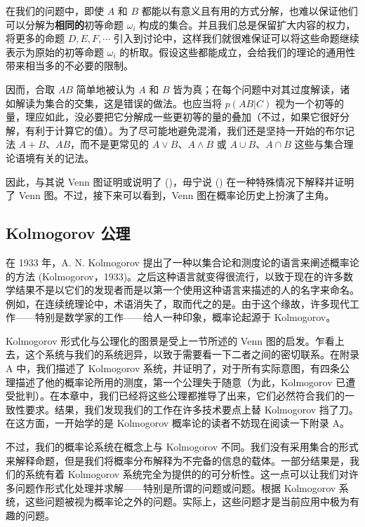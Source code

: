 在我们的问题中，即使 $A$ 和 $B$ 都能以有意义且有用的方式分解，也难以保证他们可以分解为{\bf 相同的}初等命题 $\omega_i$ 构成的集合。并且我们总是保留扩大内容的权力，将更多的命题 $D, E, F,\cdots$ 引入到讨论中，这样我们就很难保证可以将这些命题继续表示为原始的初等命题 $\omega_i$ 的析取。假设这些都能成立，会给我们的理论的通用性带来相当多的不必要的限制。

因而，合取 $AB$ 简单地被认为 $A$ 和 $B$ 皆为真；在每个问题中对其过度解读，诸如解读为集合的交集，这是错误的做法。也应当将 $p(AB|C)$ 视为一个初等的量，理应如此，没必要把它分解成一些更初等的量的叠加（不过，如果它很好分解，有利于计算它的值）。为了尽可能地避免混淆，我们还是坚持一开始的布尔记法 $A + B$、$AB$，而不是更常见的 $A\vee B$、$A\wedge B$ 或 $A\cup B$、$A\cap B$ 这些与集合理论语境有关的记法。

因此，与其说 Venn 图证明或说明了 (\in[2-104])，毋宁说 (\in[2-104]) 在一种特殊情况下解释并证明了 Venn 图。不过，接下来可以看到，Venn 图在概率论历史上扮演了主角。

\subsection{Kolmogorov 公理}

在 1933 年，A. N. Kolmogorov 提出了一种以集合论和测度论的语言来阐述概率论的方法 (Kolmogorov，1933)。之后这种语言就变得很流行，以致于现在的许多数学结果不是以它们的发现者而是以第一个使用这种语言来描述的人的名字来命名。例如，在连续统理论中，术语消失了，取而代之的是。由于这个缘故，许多现代工作——特别是数学家的工作——给人一种印象，概率论起源于 Kolmogorov。

Kolmogorov 形式化与公理化的图景是受上一节所述的 Venn 图的启发。乍看上去，这个系统与我们的系统迥异，以致于需要看一下二者之间的密切联系。在附录 A 中，我们描述了 Kolmogorov 系统，并证明了，对于所有实际意图，有四条公理描述了他的概率论所用的测度，第一个公理失于随意（为此，Kolmogorov 已遭受批判）。在本章中，我们已经将这些公理都推导了出来，它们必然符合我们的一致性要求。结果，我们发现我们的工作在许多技术要点上替 Kolmogorov 挡了刀。在这方面，一开始学的是 Kolmogorov 概率论的读者不妨现在阅读一下附录 A。

不过，我们的概率论系统在概念上与 Kolmogorov 不同。我们没有采用集合的形式来解释命题，但是我们将概率分布解释为不完备的信息的载体。一部分结果是，我们的系统有着 Kolmogorov 系统完全为提供的的可分析性。这一点可以让我们对许多问题作形式化处理并求解——特别是所谓的问题或问题。根据 Kolmogorov 系统，这些问题被视为概率论之外的问题。实际上，这些问题才是当前应用中极为有趣的问题。